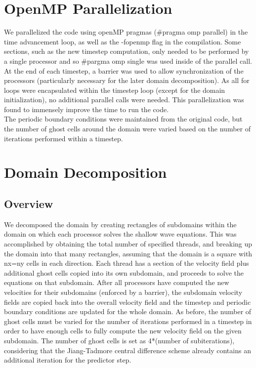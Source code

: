 \documentclass{article}
\begin{document}
\section{OpenMP Parallelization}
We parallelized the code using openMP pragmas (\#pragma omp parallel) in the time advancement loop, as well as the -fopenmp flag in the compilation. Some sections, such as the new timestep computation, only needed to be performed by a single processor and so \#pargma omp single was used inside of the parallel call. At the end of each timestep, a barrier was used to allow synchronization of the processors (particularly necessary for the later domain decomposition). As all for loops were encapsulated within the timestep loop (except for the domain initialization), no additional parallel calls were needed. This parallelization was found to immensely improve the time to run the code. \\
The periodic boundary conditions were maintained from the original code, but the number of ghost cells around the domain were varied based on the number of iterations performed within a timestep. \\

\section{Domain Decomposition}
\subsection{Overview}
We decomposed the domain by creating rectangles of subdomains within the domain on which each processor solves the shallow wave equations. This was accomplished by obtaining the total number of specified threads, and breaking up the domain into that many rectangles, assuming that the domain is a square with nx=ny cells in each direction. Each thread has a section of the velocity field plus additional ghost cells copied into its own subdomain, and proceeds to solve the equations on that subdomain. After all processors have computed the new velocities for their subdomains (enforced by a barrier), the subdomain velocity fields are copied back into the overall velocity field and the timestep and periodic boundary conditions are updated for the whole domain. As before, the number of ghost cells must be varied for the number of iterations performed in a timestep in order to have enough cells to fully compute the new velocity field on the given subdomain. The number of ghost cells is set as 4*(number of subiterations), considering that the Jiang-Tadmore central difference scheme already contains an additional iteration for the predictor step.\\
\end{document}
